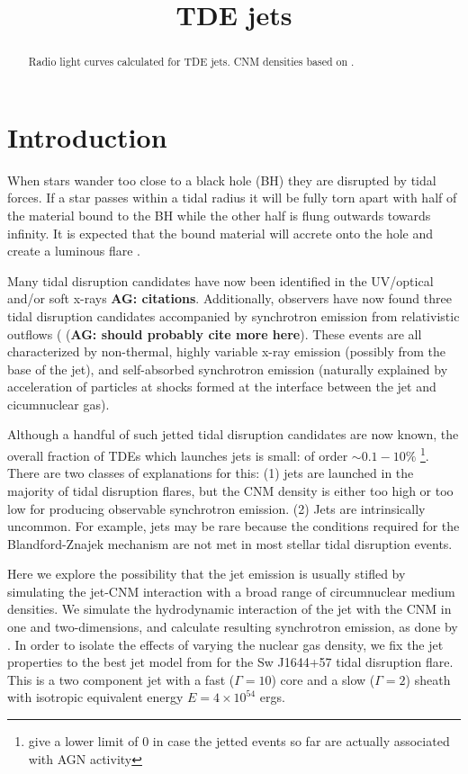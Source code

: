 \documentclass[usenatbib,fleqn]{mn2e}
\title{TDE jets}
\begin{document}
\begin{abstract}
  Radio light curves calculated for TDE jets. CNM
  densities based on \citet{Generozov+2015}. 
\end{abstract}
\section{Introduction}
\label{sec:intro}
When stars wander too close to a black hole (BH) they are disrupted by
tidal forces. If a star passes within a tidal radius it will be fully
torn apart with half of the material bound to the BH while the
other half is flung outwards towards infinity. It is expected that the
bound material will accrete onto the hole and create a luminous flare
\citep{Hills1975, Carter+1982, Rees1988}. 

Many tidal disruption candidates have now been identified in the
UV/optical and/or soft x-rays {\bf AG: citations}. Additionally,
observers have now found three tidal disruption candidates accompanied
by synchrotron emission from relativistic outflows
(\citealt{Bloom+2011, Zauderer+2011, Cenko+2012, Brown+2015} ({\bf AG:
  should probably cite more here}). These events are all characterized
by non-thermal, highly variable x-ray emission (possibly from the base
of the jet), and self-absorbed synchrotron emission (naturally
explained by acceleration of particles at shocks formed at the
interface between the jet and cicumnuclear gas).

Although a handful of such jetted tidal disruption candidates are
now known, the overall fraction of TDEs which launches jets is small:
of order $\sim 0.1-10\%$
\citep{van-Velzen+2013}\footnote{\citet{van-Velzen+2013} give a lower
  limit of 0 in case the jetted events so far are actually associated
  with AGN activity}.  There are two classes of explanations for this:
(1) jets are launched in the majority of tidal disruption flares, but
the CNM density is either too high or too low for producing observable
synchrotron emission. (2) Jets are intrinsically uncommon. For
example, jets may be rare because the conditions required for the
Blandford-Znajek mechanism are not met in most stellar tidal
disruption events.

Here we explore the possibility that the jet emission is usually
stifled by simulating the jet-CNM interaction with a broad range of
circumnuclear medium densities. We simulate the hydrodynamic
interaction of the jet with the CNM in one and two-dimensions, and
calculate resulting synchrotron emission, as done by
\citet{Mimica+2015}. In order to isolate the effects of varying the
nuclear gas density, we fix the jet properties to the best jet model
from \citet{Mimica+2015} for the Sw J1644+57 tidal disruption flare.
This is a two component jet with a fast ($\Gamma=10$) core and a slow
($\Gamma=2$) sheath with isotropic equivalent energy $E=4 \times
10^{54}$ ergs.
\end{document}
